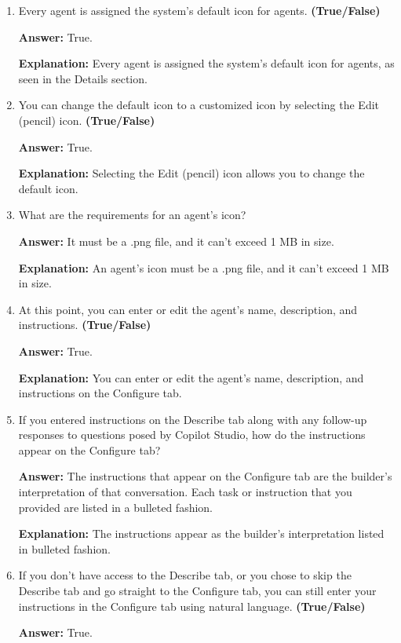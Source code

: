 \documentclass[10pt]{article}
\begin{document}
\begin{enumerate}[leftmargin=*]
\item Every agent is assigned the system’s default icon for agents. \textbf{(True/False)}

\textbf{Answer:} True.

\textbf{Explanation:} Every agent is assigned the system’s default icon for agents, as seen in the Details section.

\item You can change the default icon to a customized icon by selecting the Edit (pencil) icon. \textbf{(True/False)}

\textbf{Answer:} True.

\textbf{Explanation:} Selecting the Edit (pencil) icon allows you to change the default icon.

\item What are the requirements for an agent’s icon?

\textbf{Answer:} It must be a .png file, and it can’t exceed 1 MB in size.

\textbf{Explanation:} An agent’s icon must be a .png file, and it can’t exceed 1 MB in size.

\item At this point, you can enter or edit the agent’s name, description, and instructions. \textbf{(True/False)}

\textbf{Answer:} True.

\textbf{Explanation:} You can enter or edit the agent’s name, description, and instructions on the Configure tab.

\item If you entered instructions on the Describe tab along with any follow-up responses to questions posed by Copilot Studio, how do the instructions appear on the Configure tab?

\textbf{Answer:} The instructions that appear on the Configure tab are the builder’s interpretation of that conversation. Each task or instruction that you provided are listed in a bulleted fashion.

\textbf{Explanation:} The instructions appear as the builder’s interpretation listed in bulleted fashion.

\item If you don’t have access to the Describe tab, or you chose to skip the Describe tab and go straight to the Configure tab, you can still enter your instructions in the Configure tab using natural language. \textbf{(True/False)}

\textbf{Answer:} True.


\end{enumerate}
\end{document}
